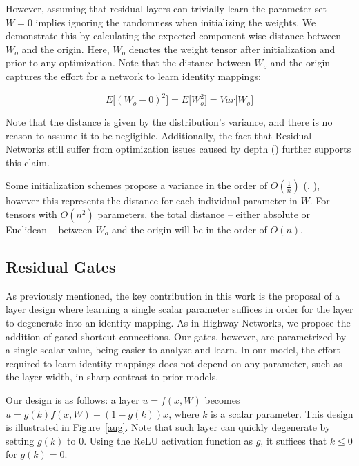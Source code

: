 \documentclass{article} %
\begin{document}
However, assuming that residual layers can trivially learn the parameter set $W = 0$ implies ignoring the randomness when initializing the weights. We demonstrate this by calculating the expected component-wise distance between $W_{o}$ and the origin. Here, $W_{o}$ denotes the weight tensor after initialization and prior to any optimization. Note that the distance between $W_{o}$ and the origin captures the effort for a network to learn identity mappings:

\begin{equation*}
	E \Big [  (W_{o} - 0)^2  \Big ] = E \Big [  W_{o}^2  \Big ] =  Var \Big [  W_{o}  \Big ]
\end{equation*}

Note that the distance is given by the distribution's variance, and there is no reason to assume it to be negligible. Additionally, the fact that Residual Networks still suffer from optimization issues caused by depth (\cite{stdepth}) further supports this claim. 

Some initialization schemes propose a variance in the order of $O(\frac{1}{n})$ (\cite{glorotinit}, \cite{prelu}), however this represents the distance for each individual parameter in $W$. For tensors with $O(n^2)$ parameters, the total distance --  either absolute or Euclidean --  between $W_{o}$ and the origin will be in the order of $O(n)$.


\subsection{Residual Gates}

As previously mentioned, the key contribution in this work is the proposal of a layer design where learning a single scalar parameter suffices in order for the layer to degenerate into an identity mapping. As in Highway Networks, we propose the addition of gated shortcut connections. Our gates, however, are parametrized by a single scalar value, being easier to analyze and learn. In our model, the effort required to learn identity mappings does not depend on any parameter, such as the layer width, in sharp contrast to prior models.

Our design is as follows: a layer $u = f(x,W)$ becomes $u = g(k) f(x,W) + (1 - g(k)) x$, where $k$ is a scalar parameter. This design is illustrated in Figure~\ref{aug}. Note that such layer can quickly degenerate by setting $g(k)$ to $0$. Using the ReLU activation function as $g$, it suffices that $k \leq 0$ for $g(k) = 0$.
\end{document}
